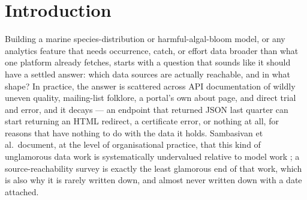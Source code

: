 %

\section{Introduction}

Building a marine species-distribution or harmful-algal-bloom model, or any
analytics feature that needs occurrence, catch, or effort data broader than
what one platform already fetches, starts with a question that sounds like it
should have a settled answer: which data sources are actually reachable, and
in what shape? In practice, the answer is scattered across API documentation
of wildly uneven quality, mailing-list folklore, a portal's own about page,
and direct trial and error, and it decays --- an endpoint that returned JSON
last quarter can start returning an HTML redirect, a certificate error, or
nothing at all, for reasons that have nothing to do with the data it holds.
Sambasivan et al.\ document, at the level of organisational practice, that
this kind of unglamorous data work is systematically undervalued relative to
model work \citep{sambasivan2021}; a source-reachability survey is exactly
the least glamorous end of that work, which is also why it is rarely written
down, and almost never written down with a date attached.

